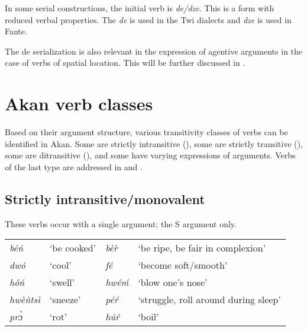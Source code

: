 \documentclass[output=paper]{langsci/langscibook}
\begin{document}
In some serial constructions, the initial verb is \textit{de/dze}. This is a form with reduced verbal properties. The \textit{de} is used in the Twi dialects and \textit{dze} is used in Fante. 

\ea
\label{ex:21.osam}
	\z

	\z
\z

The de serialization is also relevant in the expression of agentive arguments in the case of verbs of spatial location. This will be further discussed in .

\section{Akan verb classes}\label{§3:akan.osam}

Based on their argument structure, various transitivity classes of verbs can be identified in Akan. Some are strictly intransitive (), some are strictly transitive (), some are ditransitive (), and some have varying expressions of arguments. Verbs of the last type are addressed in  and .

\subsection{Strictly intransitive/monovalent}\label{§3.1:strictly.osam}

These verbs occur with a single argument; the S argument only.

\ea
\label{ex:22.osam}
\begin{table}
\begin{tabular}{llll}
\textit{béń} & ‘be cooked’ & \textit{bèr̀} & ‘be ripe, be fair in complexion’ \\
\textit{dw\'{o}} & `cool' & \textit{f\'{e}} & `become soft/smooth'  \\
\textit{h\'{o}\'{n}} & `swell' & \textit{hw\'{e}\'{m}} & `blow one's nose' \\
\textit{hw\`{e}\`{n}ts\`{i}} & `sneeze' & \textit{p\'{e}\'{r}} & `struggle, roll around during sleep'\\
\textit{prɔ̀} & `rot' & \textit{h\'{u}\'{r}} & `boil' \\
\end{tabular}
\end{table}
\z
\end{document}
